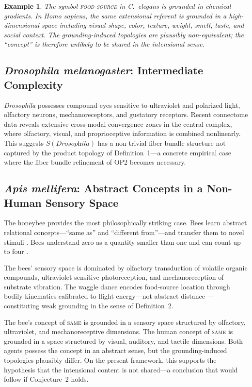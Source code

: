 \documentclass[12pt]{article}
\newtheorem{example}{Example}
\begin{document}
\begin{example}
The symbol \textsc{food-source} in \textit{C.~elegans} is grounded in
chemical gradients. In \textit{Homo sapiens}, the same extensional
referent is grounded in a high-dimensional space including visual shape,
color, texture, weight, smell, taste, and social context. The
grounding-induced topologies are plausibly non-equivalent; the
``concept'' is therefore unlikely to be shared in the intensional sense.
\end{example}

\subsection{\textit{Drosophila melanogaster}: Intermediate Complexity}

\textit{Drosophila} possesses compound eyes sensitive to ultraviolet
and polarized light, olfactory neurons, mechanoreceptors, and gustatory
receptors.
Recent connectome data \cite{scheffer2020} reveals extensive cross-modal
convergence zones in the central complex, where olfactory, visual, and
proprioceptive information is combined nonlinearly.
This suggests $S(\textit{Drosophila})$ has a non-trivial fiber bundle
structure not captured by the product topology of Definition~1---a
concrete empirical case where the fiber bundle refinement of OP2
becomes necessary.

\subsection{\textit{Apis mellifera}: Abstract Concepts in a Non-Human Sensory Space}

The honeybee provides the most philosophically striking case.
Bees learn abstract relational concepts---``same as'' and ``different
from''---and transfer them to novel stimuli \cite{giurfa2001}.
Bees understand zero as a quantity smaller than one \cite{howard2018}
and can count up to four \cite{howard2019}.

The bees' sensory space is dominated by olfactory transduction of
volatile organic compounds, ultraviolet-sensitive photoreception,
and mechanoreception of substrate vibration.
The waggle dance encodes food-source location through bodily kinematics
calibrated to flight energy---not abstract distance
\cite{riley2005}---constituting weak grounding in the sense of
Definition~2.

The bee's concept of \textsc{same} is grounded in a sensory space
structured by olfactory, ultraviolet, and mechanoreceptive dimensions.
The human concept of \textsc{same} is grounded in a space structured
by visual, auditory, and tactile dimensions.
Both agents possess the concept in an abstract sense, but the
grounding-induced topologies plausibly differ.
On the present framework, this supports the hypothesis that the
intensional content is not shared---a conclusion that would follow if
Conjecture~2 holds.
\end{document}
